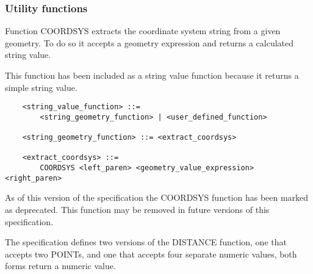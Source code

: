 \documentclass[11pt,a4paper]{ivoa}
\begin{document}

\subsubsection{Utility functions}
\label{sec:functions.geom.utility}

Function COORDSYS extracts the coordinate system string from a given
geometry. To do so it accepts a geometry expression and returns a calculated
string value.

This function has been included as a string value function because it
returns a simple string value.

\begin{verbatim}
    <string_value_function> ::=
        <string_geometry_function> | <user_defined_function>

    <string_geometry_function> ::= <extract_coordsys>

    <extract_coordsys> ::=
        COORDSYS <left_paren> <geometry_value_expression> <right_paren>
\end{verbatim}

As of this version of the specification the COORDSYS function has
been marked as deprecated. This function may be removed in future versions
of this specification.

The specification defines two versions of the DISTANCE function,
one that accepts two POINTs, and one that accepts four
separate numeric values, both forms return a numeric value.
\end{document}
